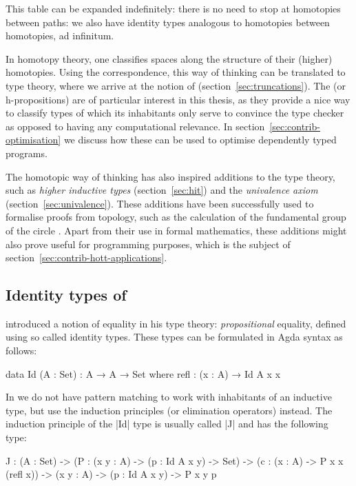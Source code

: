 This table can be expanded indefinitely: there is no need to stop at
homotopies between paths: we also have identity types analogous to
homotopies between homotopies, ad infinitum.

In homotopy theory, one classifies spaces along the structure of their
(higher) homotopies. Using the correspondence, this way of thinking
can be translated to type theory, where we arrive at the notion of
 (section~\ref{sec:truncations}). The  (or
h-propositions) are of particular interest in this thesis, as they
provide a nice way to classify types of which its inhabitants only
serve to convince the type checker as opposed to having any
computational relevance. In section~\ref{sec:contrib-optimisation} we
discuss how these can be used to optimise dependently typed programs.

The homotopic way of thinking has also inspired additions to the type
theory, such as \emph{higher inductive types} (section~\ref{sec:hit})
and the \emph{univalence axiom} (section~\ref{sec:univalence}). These
additions have been successfully used to formalise proofs from
topology, such as the calculation of the fundamental group of the
circle \citep{fundamentalgroup}. Apart from their use in formal
mathematics, these additions might also prove useful for programming
purposes, which is the subject of
section~\ref{sec:contrib-hott-applications}.

\subsection{Identity types of \MLTT}
\label{sec:identitytypes}

\cite{mltt} introduced a notion of equality in his type theory:
\emph{propositional} equality, defined using so called identity
types. These types can be formulated in Agda syntax as follows:

\begin{code}
  data Id (A : Set) : A → A → Set where
    refl : (x : A) → Id A x x
\end{code}

In \MLTT we do not have pattern matching to work with inhabitants of
an inductive type, but use the induction principles (or elimination
operators) instead. The induction principle of the |Id| type is
usually called |J| and has the following type:

\begin{code}
  J :   (A : Set)
    ->  (P : (x y : A) -> (p : Id A x y) -> Set)
    -> (c : (x : A) -> P x x (refl x))
    -> (x y : A) -> (p : Id A x y)
    -> P x y p
\end{code}

